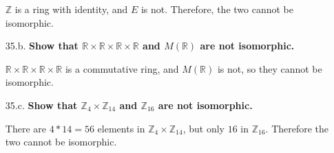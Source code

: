\documentclass{article}
\begin{document}
\begin{enumerate}
			$\mathbb{Z}$ is a ring with identity, and $E$ is not. Therefore, the two cannot be 
			isomorphic.

		\item [35.b.] \textbf{Show that $\mathbb{R} \times \mathbb{R} \times \mathbb{R} \times 
							  \mathbb{R}$ and $M(\mathbb{R})$ are not isomorphic.}

			$\mathbb{R} \times \mathbb{R} \times \mathbb{R} \times \mathbb{R}$ is a commutative
			ring, and $M(\mathbb{R})$ is not, so they cannot be isomorphic.

		\item [35.c.] \textbf{Show that $\mathbb{Z}_4 \times \mathbb{Z}_{14}$ and $\mathbb{Z}_{16}$ 
							  are not isomorphic.}

			There are $4 * 14 = 56$ elements in $\mathbb{Z}_4 \times \mathbb{Z}_{14}$, but only $16$
			in $\mathbb{Z}_{16}$. Therefore the two cannot be isomorphic.

	\end{enumerate}
\end{document}
